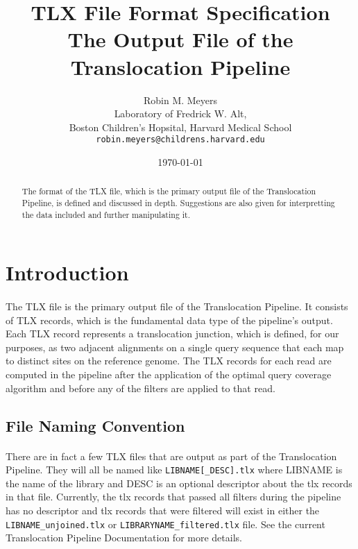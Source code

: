 \documentclass{article}
\begin{document}
\title{TLX File Format Specification \\ \large The Output File of the Translocation Pipeline}
\author{Robin M. Meyers\\
  Laboratory of Fredrick W. Alt,\\
  Boston Children's Hopsital, Harvard Medical School\\
  \texttt{robin.meyers@childrens.harvard.edu}}
\date{\today}
\maketitle

\begin{abstract}
The format of the TLX file, which is the primary output file of the Translocation Pipeline, is defined and discussed in depth. Suggestions are also given for interpretting the data included and further manipulating it. 
\end{abstract}

\section{Introduction}
\paragraph{} The TLX file is the primary output file of the Translocation Pipeline. It consists of TLX records, which is the fundamental data type of the pipeline's output. Each TLX record represents a translocation junction, which is defined, for our purposes, as two adjacent alignments on a single query sequence that each map to distinct sites on the reference genome. The TLX records for each read are computed in the pipeline after the application of the optimal query coverage algorithm and before any of the filters are applied to that read. 

\subsection{File Naming Convention}
\paragraph{} There are in fact a few TLX files that are output as part of the Translocation Pipeline. They will all be named like \texttt{LIBNAME[\_DESC].tlx} where LIBNAME is the name of the library and DESC is an optional descriptor about the tlx records in that file. Currently, the tlx records that passed all filters during the pipeline has no descriptor and tlx records that were filtered will exist in either the \texttt{LIBNAME\_unjoined.tlx} or \texttt{LIBRARYNAME\_filtered.tlx} file. See the current Translocation Pipeline Documentation for more details.
\end{document}
